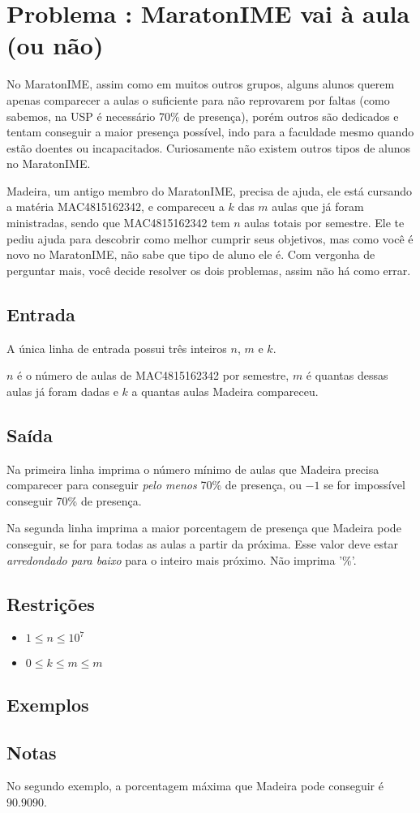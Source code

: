\section*{Problema \proxLetra: MaratonIME vai à aula (ou não)}

No MaratonIME, assim como em muitos outros grupos, alguns alunos querem apenas comparecer a aulas o suficiente para não reprovarem por faltas (como sabemos, na USP é necessário 70\% de presença), porém outros são dedicados e tentam conseguir a maior presença possível, indo para a faculdade mesmo quando estão doentes ou incapacitados. Curiosamente não existem outros tipos de alunos no MaratonIME.

Madeira, um antigo membro do MaratonIME, precisa de ajuda, ele está cursando a matéria MAC4815162342, e compareceu a $k$ das $m$ aulas que já foram ministradas, sendo que MAC4815162342 tem $n$ aulas totais por semestre. Ele te pediu ajuda para descobrir como melhor cumprir seus objetivos, mas como você é novo no MaratonIME, não sabe que tipo de aluno ele é. Com vergonha de perguntar mais, você decide resolver os dois problemas, assim não há como errar.


\subsection*{Entrada}
\textoDiversasInstanciasEOF

A única linha de entrada possui três inteiros $n$, $m$ e $k$.

$n$ é o número de aulas de MAC4815162342 por semestre, $m$ é quantas dessas aulas já foram dadas e $k$ a quantas aulas Madeira compareceu.

\subsection*{Saída}

Na primeira linha imprima o número mínimo de aulas que Madeira precisa comparecer para conseguir \emph{pelo menos} 70\% de presença, ou $-1$ se for impossível conseguir 70\% de presença.

Na segunda linha imprima a maior porcentagem de presença que Madeira pode conseguir, se for para todas as aulas a partir da próxima. Esse valor deve estar \emph{arredondado para baixo} para o inteiro mais próximo. Não imprima '\%'.


\subsection*{Restrições}

\begin{itemize}
  \item $1 \leq n \leq 10^7$
  \item $0 \leq k \leq m \leq m$
\end{itemize}

\subsection*{Exemplos}


\subsection*{Notas}

No segundo exemplo, a porcentagem máxima que Madeira pode conseguir é $90.9090$.
